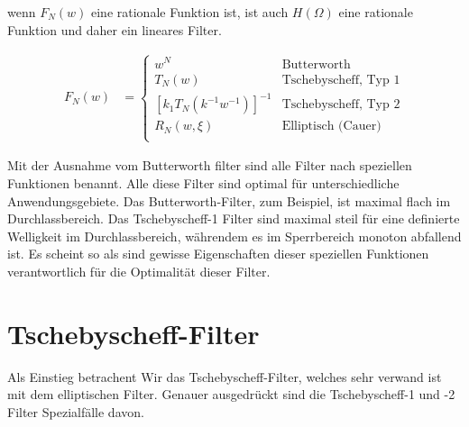 \begin{refsection}
wenn $F_N(w)$ eine rationale Funktion ist, ist auch $H(\Omega)$ eine rationale Funktion und daher ein lineares Filter. %

\begin{align}
    F_N(w) & =
    \begin{cases}
        w^N                            & \text{Butterworth} \\
        T_N(w)                         & \text{Tschebyscheff, Typ 1}  \\
        [k_1 T_N (k^{-1} w^{-1})]^{-1} & \text{Tschebyscheff, Typ 2}  \\
        R_N(w, \xi)                    & \text{Elliptisch (Cauer)}    \\
    \end{cases}
\end{align}

Mit der Ausnahme vom Butterworth filter sind alle Filter nach speziellen Funktionen benannt.
Alle diese Filter sind optimal für unterschiedliche Anwendungsgebiete.
Das Butterworth-Filter, zum Beispiel, ist maximal flach im Durchlassbereich.
Das Tschebyscheff-1 Filter sind maximal steil für eine definierte Welligkeit im Durchlassbereich, währendem es im Sperrbereich monoton abfallend ist.
Es scheint so als sind gewisse Eigenschaften dieser speziellen Funktionen verantwortlich für die Optimalität dieser Filter.

\section{Tschebyscheff-Filter}

Als Einstieg betrachent Wir das Tschebyscheff-Filter, welches sehr verwand ist mit dem elliptischen Filter.
Genauer ausgedrückt sind die Tschebyscheff-1 und -2 Filter Spezialfälle davon.


\end{refsection}
